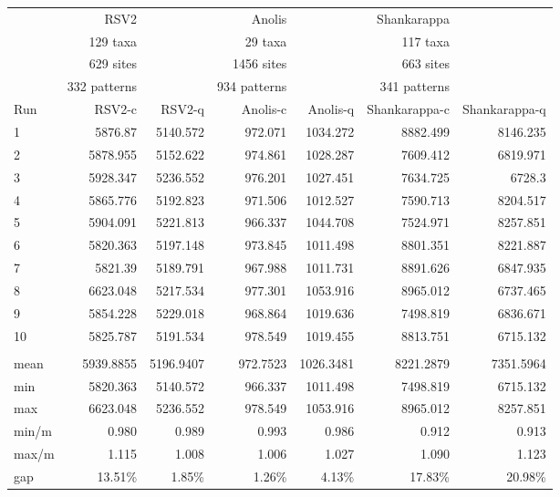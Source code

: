 \documentclass[a4wide]{article}
\begin{document}
\begin{tabular}{lrrrrrr}
	&	RSV2	&		&	Anolis	&		&	Shankarappa	&	\\
	&	  129 taxa	&		&	  29 taxa	&		&	  117 taxa	&	\\
	&	  629 sites	&		&	  1456 sites	&		&	  663 sites	&	\\
	&	  332 patterns	&		&	  934 patterns	&		&	  341 patterns	&	\\
Run	&	RSV2-c	&	RSV2-q	&	Anolis-c	&	Anolis-q	&	Shankarappa-c	&	Shankarappa-q\\
1	&	5876.87	&	5140.572	&	972.071	&	1034.272	&	8882.499	&	8146.235\\
2	&	5878.955	&	5152.622	&	974.861	&	1028.287	&	7609.412	&	6819.971\\
3	&	5928.347	&	5236.552	&	976.201	&	1027.451	&	7634.725	&	6728.3\\
4	&	5865.776	&	5192.823	&	971.506	&	1012.527	&	7590.713	&	8204.517\\
5	&	5904.091	&	5221.813	&	966.337	&	1044.708	&	7524.971	&	8257.851\\
6	&	5820.363	&	5197.148	&	973.845	&	1011.498	&	8801.351	&	8221.887\\
7	&	5821.39	&	5189.791	&	967.988	&	1011.731	&	8891.626	&	6847.935\\
8	&	6623.048	&	5217.534	&	977.301	&	1053.916	&	8965.012	&	6737.465\\
9	&	5854.228	&	5229.018	&	968.864	&	1019.636	&	7498.819	&	6836.671\\
10	&	5825.787	&	5191.534	&	978.549	&	1019.455	&	8813.751	&	6715.132\\
	&		&		&		&		&		&	\\
mean	&	5939.8855	&	5196.9407	&	972.7523	&	1026.3481	&	8221.2879	&	7351.5964\\
min	&	5820.363	&	5140.572	&	966.337	&	1011.498	&	7498.819	&	6715.132\\
max	&	6623.048	&	5236.552	&	978.549	&	1053.916	&	8965.012	&	8257.851\\
min/m	&	0.980	&	0.989	&	0.993	&	0.986	&	0.912	&	0.913\\
max/m	&	1.115	&	1.008	&	1.006	&	1.027	&	1.090	&	1.123\\
gap 	&	13.51\%	&	1.85\%	&	1.26\%	&	4.13\%	&	17.83\%	&	20.98\%\\
\end{tabular}
\end{document}
